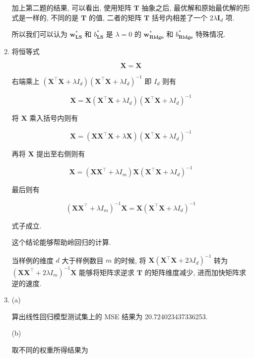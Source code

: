 \documentclass[answers]{exam}  %
\begin{document}
\begin{questions}
\begin{solution}
\begin{enumerate}
            加上第二题的结果, 可以看出, 使用矩阵 $\bm{T}$ 抽象之后, 最优解和原始最优解的形式是一样的, 不同的是 $\bm{T}$ 的值, 二者的矩阵 $\bm{T}$ 括号内相差了一个 $2\lambda \bm{I}_d$ 项.

            所以我们可以认为 $\bm{w}^{*}_{\mathbf{LS}}$ 和 $b^{*}_{\mathbf{LS}}$ 是 $\lambda=0$ 的 $\bm{w}^{*}_{\mathbf{Ridge}}$ 和 $b^{*}_{\mathbf{Ridge}}$ 特殊情况.

      \item 将恒等式

            $$
              \bm{X} = \bm{X}
            $$

            右端乘上 $(\bm{X}^{\top}\bm{X}+\lambda I_{d})(\bm{X}^{\top}\bm{X}+\lambda I_{d})^{-1}$ 即 $I_{d}$ 则有

            $$
              \bm{X} = \bm{X}(\bm{X}^{\top}\bm{X}+\lambda I_{d})(\bm{X}^{\top}\bm{X}+\lambda I_{d})^{-1}
            $$

            将 $\bm{X}$ 乘入括号内则有

            $$
              \bm{X} = (\bm{X}\bm{X}^{\top}\bm{X}+\lambda \bm{X})(\bm{X}^{\top}\bm{X}+\lambda I_{d})^{-1}
            $$

            再将 $\bm{X}$ 提出至右侧则有

            $$
              \bm{X} = (\bm{X}\bm{X}^{\top}+\lambda I_{m})\bm{X}(\bm{X}^{\top}\bm{X}+\lambda I_{d})^{-1}
            $$

            最后则有

            $$
              (\bm{X}\bm{X}^{\top}+\lambda I_{m})^{-1}\bm{X} = \bm{X}(\bm{X}^{\top}\bm{X}+\lambda I_{d})^{-1}
            $$

            式子成立.

            这个结论能够帮助岭回归的计算.

            当样例的维度 $d$ 大于样例数目 $m$ 的时候, 将 $\bm{X}(\bm{X}^{\top}\bm{X}+2\lambda I_{d})^{-1}$ 转为 $(\bm{X}\bm{X}^{\top}+2\lambda I_{m})^{-1}\bm{X}$ 能够将矩阵求逆求 $\bm{T}$ 的矩阵维度减少, 进而加快矩阵求逆的速度.

      \item (a)

            算出线性回归模型测试集上的 MSE 结果为 20.724023437336253.

            (b)

            取不同的权重所得结果为


\end{enumerate}
\end{solution}
\end{questions}
\end{document}
